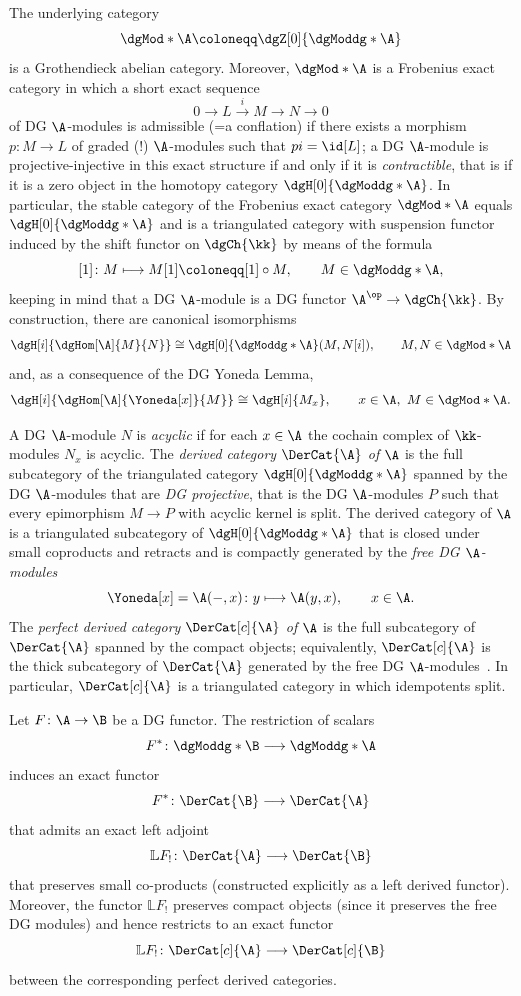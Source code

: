 \documentclass[a4paper]{amsart}
\begin{document}
The underlying category
\[
  \dgMod*{\A}\coloneqq\dgZ[0]{\dgModdg*{\A}}
\]
is a Grothendieck abelian category. Moreover, $\dgMod*{\A}$ is a Frobenius exact
category in which a short exact sequence
\[
  0\to L\stackrel{i}{\to}M\to N\to 0
\]
of DG $\A$-modules is admissible (=a conflation) if there exists a morphism
$p\colon M\to L$ of graded (!) $\A$-modules such that $pi=\id[L]$; a DG
$\A$-module is projective-injective in this exact structure if and only if it is
\emph{contractible}, that is if it is a zero object in the homotopy category
$\dgH[0]{\dgModdg*{\A}}$. In particular, the stable category of the Frobenius
exact category $\dgMod*{\A}$ equals $\dgH[0]{\dgModdg*{\A}}$ and is a
triangulated category with suspension functor induced by the shift functor on
$\dgCh{\kk}$ by means of the formula
\[
  [1]\colon M\longmapsto M[1]\coloneqq[1]\circ M,\qquad M\in\dgModdg*{\A},
\]
keeping in mind that a DG $\A$-module is a DG functor $\A^\op\to\dgCh{\kk}$. By
construction, there are canonical isomorphisms
\[
  \dgH[i]{\dgHom[\A]{M}{N}}\cong\dgH[0]{\dgModdg*{\A}}(M,N[i]),\qquad
  M,N\in\dgMod*{\A}
\]
and, as a consequence of the DG Yoneda Lemma,
\[
  \dgH[i]{\dgHom[\A]{\Yoneda[x]}{M}}\cong\dgH[i]{M_x},\qquad x\in\A,\
  M\in\dgMod*{\A}.
\]

A DG $\A$-module $N$ is \emph{acyclic} if for each $x\in\A$ the cochain complex
of $\kk$-modules $N_x$ is acyclic. The \emph{derived category $\DerCat{\A}$ of
  $\A$} is the full subcategory of the triangulated category
$\dgH[0]{\dgModdg*{\A}}$ spanned by the DG $\A$-modules that are \emph{DG
  projective}, that is the DG $\A$-modules $P$ such that every epimorphism $M\to
P$ with acyclic kernel is split. The derived category of $\A$ is a triangulated
subcategory of $\dgH[0]{\dgModdg*{\A}}$ that is closed under small coproducts
and retracts and is compactly generated by the \emph{free DG $\A$-modules}
\[
  \Yoneda[x]=\A(-,x)\colon y\longmapsto\A(y,x),\qquad x\in\A.
\]
The \emph{perfect derived category $\DerCat[c]{\A}$ of $\A$} is the full
subcategory of $\DerCat{\A}$ spanned by the compact objects; equivalently,
$\DerCat[c]{\A}$ is the thick subcategory of $\DerCat{\A}$ generated by the free
DG $\A$-modules~\cite[Thm.~5.3]{Kel94}. In particular, $\DerCat[c]{\A}$ is a
triangulated category in which idempotents split.

Let $F\colon\A\to\B$ be a DG functor. The restriction of scalars
\[
  F^*\colon\dgModdg*{\B}\longrightarrow\dgModdg*{\A}
\]
induces an exact functor
\[
  F^*\colon\DerCat{\B}\longrightarrow\DerCat{\A}
\]
that admits an exact left adjoint
\[
  \mathbb{L}F_!\colon\DerCat{\A}\longrightarrow\DerCat{\B}
\]
that preserves small co-products (constructed explicitly as a left derived
functor). Moreover, the functor $\mathbb{L}F_!$ preserves compact objects (since
it preserves the free DG modules) and hence restricts to an exact functor
\[
  \mathbb{L}F_!\colon\DerCat[c]{\A}\longrightarrow\DerCat[c]{\B}
\]
between the corresponding perfect derived categories.
\end{document}
